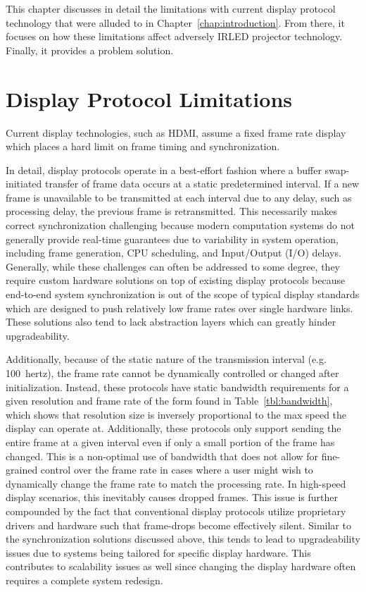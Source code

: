 \label{chap:problem_formulation}

This chapter discusses in detail the limitations with current display protocol technology that were alluded to in Chapter~\ref{chap:introduction}. From there, it focuses on how these limitations affect adversely IRLED projector technology. Finally, it provides a problem solution.

\section{Display Protocol Limitations}

    Current display technologies, such as HDMI, assume a fixed frame rate display which places a hard limit on frame timing and synchronization.

    In detail, display protocols operate in a best-effort fashion where a buffer swap-initiated transfer of frame data occurs at a static predetermined interval. If a new frame is unavailable to be transmitted at each interval due to any delay, such as processing delay, the previous frame is retransmitted. This necessarily makes correct synchronization challenging because modern computation systems do not generally provide real-time guarantees due to variability in system operation, including frame generation, CPU scheduling, and Input/Output (I/O) delays. Generally, while these challenges can often be addressed to some degree, they require custom hardware solutions on top of existing display protocols because end-to-end system synchronization is out of the scope of typical display standards which are designed to push relatively low frame rates over single hardware links. These solutions also tend to lack abstraction layers which can greatly hinder upgradeability.

    Additionally, because of the static nature of the transmission interval (e.g. \mbox {100 hertz}), the frame rate cannot be dynamically controlled or changed after initialization. Instead, these protocols have static bandwidth requirements for a given resolution and frame rate of the form found in Table~\ref{tbl:bandwidth}, which shows that resolution size is inversely proportional to the max speed the display can operate at. Additionally, these protocols only support sending the entire frame at a given interval even if only a small portion of the frame has changed. This is a non-optimal use of bandwidth that does not allow for fine-grained control over the frame rate in cases where a user might wish to dynamically change the frame rate to match the processing rate. In high-speed display scenarios, this inevitably causes dropped frames. This issue is further compounded by the fact that conventional display protocols utilize proprietary drivers and hardware such that frame-drops become effectively silent. Similar to the synchronization solutions discussed above, this tends to lead to upgradeability issues due to systems being tailored for specific display hardware. This contributes to scalability issues as well since changing the display hardware often requires a complete system redesign.

